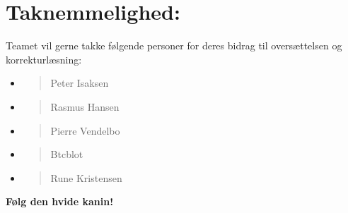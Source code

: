 \section*{Taknemmelighed:}

Teamet vil gerne takke følgende personer for deres bidrag til
oversættelsen og korrekturlæsning:

\begin{itemize}
\item
  \begin{quote}
  Peter Isaksen
  \end{quote}
\item
  \begin{quote}
  Rasmus Hansen
  \end{quote}
\item
  \begin{quote}
  Pierre Vendelbo
  \end{quote}
\item
  \begin{quote}
  Btcblot
  \end{quote}
\item
  \begin{quote}
  Rune Kristensen
  \end{quote}
\end{itemize}

\textbf{Følg den hvide kanin!}
